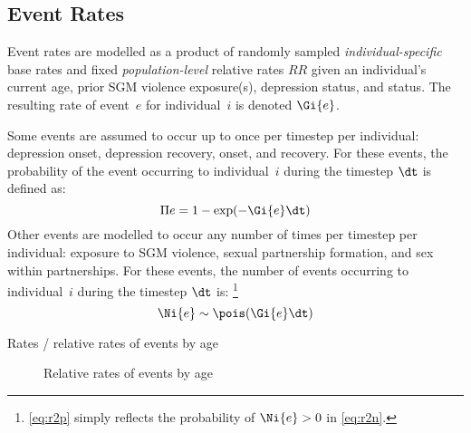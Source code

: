 \subsection{Event Rates}\label{mod.par.evt}
Event rates are modelled as a product of
randomly sampled \emph{individual-specific} base rates \Ri{} and
fixed \emph{population-level} relative rates $RR$
given an individual's current age,
prior SGM violence exposure(s), depression status, and \hazdrink status.
The resulting rate of event~$e$ for individual~$i$ is denoted $\Gi{e}$.
\par
Some events are assumed to occur up to once per timestep per individual:
depression onset, depression recovery,
\hazdrink onset, and \hazdrink recovery.
For these events, the probability of the event occurring to individual~$i$
during the timestep $\dt$ is defined as:
\begin{equation}\label{eq:r2p}
  \Pi{e} = 1 - \exp(-\Gi{e}\dt)
\end{equation}
Other events are modelled to occur
any number of times per timestep per individual:
exposure to SGM violence,
sexual partnership formation,
and sex within partnerships.
For these events, the number of events occurring to individual~$i$
during the timestep $\dt$ is:%
\footnote{\eqref{eq:r2p} simply reflects
  the probability of $\Ni{e} > 0$ in \eqref{eq:r2n}.}
\begin{equation}\label{eq:r2n}
  \Ni{e} \sim \pois(\Gi{e}\dt)
\end{equation}
\begin{table}
  \caption{Rates / relative rates of events by age}
  \label{tab:rr.age}
  \centering
\end{table}
\begin{figure}[t]
  \centering[TODO]
  \caption{Relative rates of events by age}
  \label{fig:age.rr}
\end{figure}

